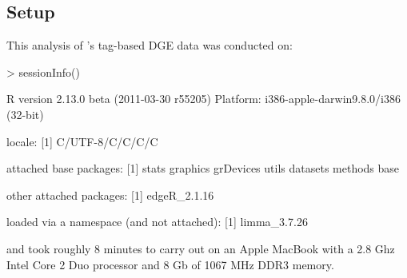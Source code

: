 \subsection{Setup}
This analysis of \citet{THoen:2008p9}'s tag-based DGE data was conducted on:
\begin{Schunk}
\begin{Sinput}
> sessionInfo()
\end{Sinput}
\begin{Soutput}
R version 2.13.0 beta (2011-03-30 r55205)
Platform: i386-apple-darwin9.8.0/i386 (32-bit)

locale:
[1] C/UTF-8/C/C/C/C

attached base packages:
[1] stats     graphics  grDevices utils     datasets  methods   base     

other attached packages:
[1] edgeR_2.1.16

loaded via a namespace (and not attached):
[1] limma_3.7.26
\end{Soutput}
\end{Schunk}
and took roughly 8 minutes to carry out on an Apple MacBook with a 2.8 Ghz Intel Core 2 Duo processor and 8 Gb of 1067 MHz DDR3 memory.


